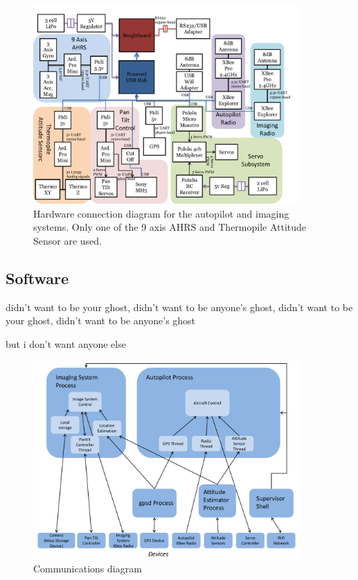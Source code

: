 \documentclass[pdftex,10pt,letter]{article}
\begin{document}
\begin{figure}
	\centering
	\includegraphics[width=0.9\textwidth]{../images/hardware_conn_diagram.pdf}
	\caption{Hardware connection diagram for the autopilot and imaging systems. Only one of the 9 axis AHRS and Thermopile Attitude Sensor are used.}
	\label{fig:hardware_conn_diagram}
\end{figure}

\subsection{Software}
\label{sec:autopilot_software}
didn't want to be your ghost, didn't want to be anyone's ghost, didn't want to be your ghost, didn't want to be anyone's ghost

but i don't want anyone else
\begin{figure}
	\centering
	\includegraphics[width=0.9\textwidth]{../images/software_comm_diagram.pdf}
	\caption{Communications diagram}	
	\label{fig:software_comm_diagram}
\end{figure}
\end{document}
